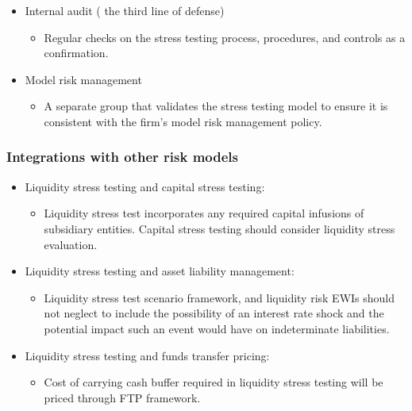 \begin{itemize}
\begin{itemize}
    \end{itemize}
\item Internal audit ( the third line of defense)
    \begin{itemize}
    \item Regular checks on the stress testing process, procedures, and controls as a confirmation.
    \end{itemize}
\item Model risk management
    \begin{itemize}
    \item A separate group that validates the stress testing model to ensure it is consistent with the firm's model risk management policy.
    \end{itemize}
\end{itemize}




\subsubsection{Integrations with other risk models}
\begin{itemize}
\item Liquidity stress testing and capital stress testing:
    \begin{itemize}
    \item Liquidity stress test incorporates any required capital infusions of subsidiary entities. Capital stress testing should consider liquidity stress evaluation.
    \end{itemize}
\item Liquidity stress testing and asset liability management:
    \begin{itemize}
    \item Liquidity stress test scenario framework, and liquidity risk EWIs should not neglect to include the possibility of an interest rate shock and the potential impact such an event would have on indeterminate liabilities.
    \end{itemize}
\item Liquidity stress testing and funds transfer pricing:
    \begin{itemize}
    \item Cost of carrying cash buffer required in liquidity stress testing will be priced through FTP framework.
    \end{itemize}
\end{itemize}



